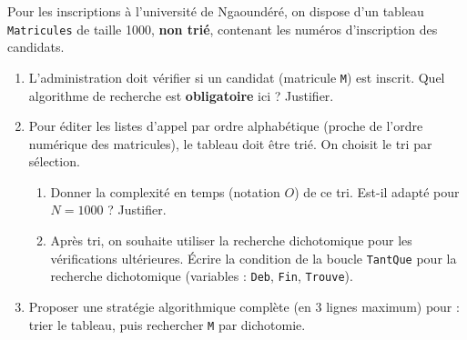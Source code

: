 \documentclass[11pt]{article}
\begin{document}
\begin{exercice}
Pour les inscriptions à l'université de Ngaoundéré, on dispose d'un tableau \texttt{Matricules} de taille 1000, \textbf{non trié}, contenant les numéros d'inscription des candidats.
\begin{enumerate}
    \item L'administration doit vérifier si un candidat (matricule \texttt{M}) est inscrit. Quel algorithme de recherche est \textbf{obligatoire} ici ? Justifier.
    \item Pour éditer les listes d'appel par ordre alphabétique (proche de l'ordre numérique des matricules), le tableau doit être trié. On choisit le tri par sélection.
    \begin{enumerate}
        \item Donner la complexité en temps (notation $O$) de ce tri. Est-il adapté pour $N=1000$ ? Justifier.
        \item Après tri, on souhaite utiliser la recherche dichotomique pour les vérifications ultérieures. Écrire la condition de la boucle \texttt{TantQue} pour la recherche dichotomique (variables : \texttt{Deb}, \texttt{Fin}, \texttt{Trouve}).
    \end{enumerate}
    \item Proposer une stratégie algorithmique complète (en 3 lignes maximum) pour : trier le tableau, puis rechercher \texttt{M} par dichotomie.
\end{enumerate}
\end{exercice}
\end{document}
